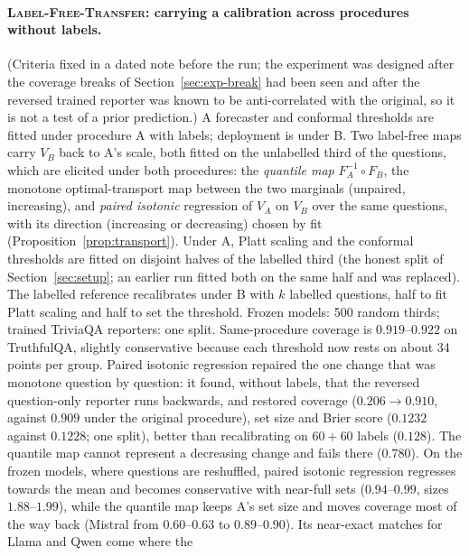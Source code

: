 \documentclass[11pt]{article}
\theoremstyle{definition}
\theoremstyle{remark}
\newcommand{\1}{\mathbf{1}}
\newcommand{\expname}[1]{\textsc{#1}}
\begin{document}
\paragraph{\expname{Label-Free-Transfer}: carrying a calibration across procedures without labels.} (Criteria fixed in a
dated note before the run; the experiment was designed after the coverage breaks of
Section~\ref{sec:exp-break} had been seen and after the reversed trained reporter was known to be
anti-correlated with the original, so it is not a test of a prior prediction.) A forecaster and
conformal thresholds are fitted under procedure A with labels; deployment is under B. Two label-free
maps carry $V_B$ back to A's scale, both fitted on the unlabelled third of the questions, which are
elicited under both procedures: the \emph{quantile map} $F_A^{-1}\circ F_B$, the monotone
optimal-transport map between the two marginals (unpaired, increasing), and \emph{paired isotonic}
regression of $V_A$ on $V_B$ over the same questions, with its direction (increasing or decreasing)
chosen by fit (Proposition~\ref{prop:transport}). Under A, Platt scaling and the conformal thresholds are fitted on disjoint halves of the labelled third
(the honest split of Section~\ref{sec:setup}; an earlier run fitted both on the same half and was
replaced). The labelled reference recalibrates under B with $k$ labelled questions, half to fit Platt
scaling and half to set the threshold. Frozen models: 500 random thirds; trained TriviaQA reporters: one
split. Same-procedure coverage is $0.919$--$0.922$ on TruthfulQA, slightly conservative because each
threshold now rests on about 34 points per group.
Paired isotonic regression repaired the one change that was monotone question by question: it found,
without labels, that the reversed question-only reporter runs backwards, and restored coverage ($0.206\to
0.910$, against $0.909$ under the original procedure), set size and Brier score ($0.1232$ against $0.1228$;
one split), better than recalibrating on $60{+}60$ labels ($0.128$). The quantile map cannot represent a
decreasing change and fails there ($0.780$). On the frozen models, where questions are reshuffled, paired
isotonic regression regresses towards the mean and becomes conservative with near-full sets ($0.94$--$0.99$,
sizes $1.88$--$1.99$), while the quantile map keeps A's set size and moves coverage most of the way back
(Mistral from $0.60$--$0.63$ to $0.89$--$0.90$). Its near-exact matches for Llama and Qwen come where the
\end{document}
